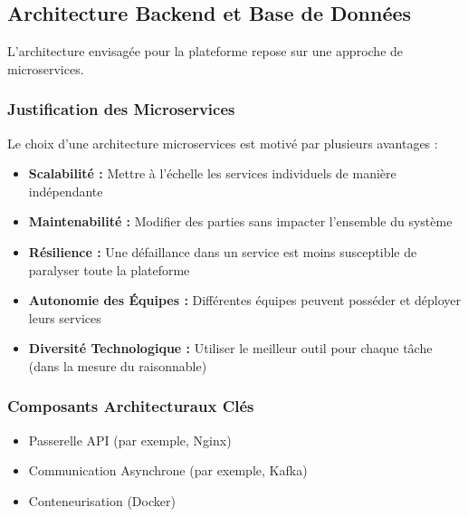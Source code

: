 \documentclass[12pt, a4paper]{article}
\begin{document}
\subsection{Architecture Backend et Base de Données}
L'architecture envisagée pour la plateforme repose sur une approche de microservices.

\subsubsection{Justification des Microservices}
Le choix d'une architecture microservices est motivé par plusieurs avantages :
\begin{itemize}
  \item \textbf{Scalabilité :} Mettre à l'échelle les services individuels de manière indépendante
  \item \textbf{Maintenabilité :} Modifier des parties sans impacter l'ensemble du système
  \item \textbf{Résilience :} Une défaillance dans un service est moins susceptible de paralyser toute la plateforme
  \item \textbf{Autonomie des Équipes :} Différentes équipes peuvent posséder et déployer leurs services
  \item \textbf{Diversité Technologique :} Utiliser le meilleur outil pour chaque tâche (dans la mesure du raisonnable)
\end{itemize}

\subsubsection{Composants Architecturaux Clés}
\begin{itemize}
  \item Passerelle API (par exemple, Nginx)
  \item Communication Asynchrone (par exemple, Kafka)
  \item Conteneurisation (Docker)
\end{itemize}
\end{document}
